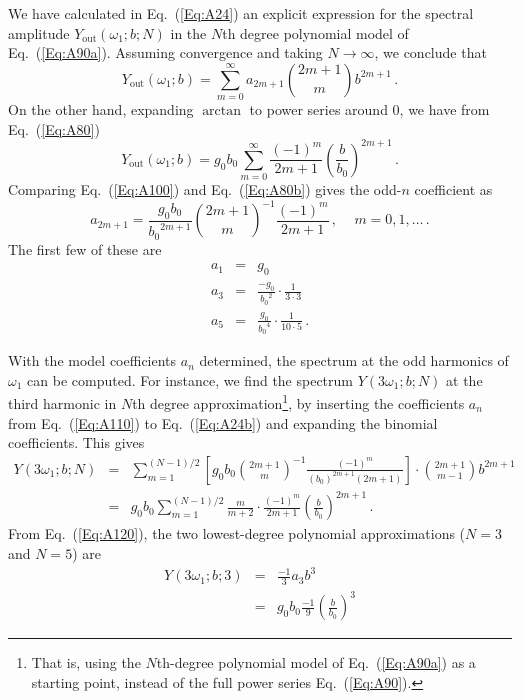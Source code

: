 \documentclass[11pt,oneside,a4paper]{scrartcl}
\newcommand{\EQ}[1]{\begin{equation}\label{Eq:#1}}
\newcommand{\EE}{\end{equation}}
\newcommand{\Eq}[1]{Eq.~(\ref{Eq:#1})}
\newcommand { \mr }[1] {\ensuremath {\mathrm{#1}}}
\begin{document}
We have calculated in \Eq{A24} an explicit expression for the spectral amplitude 
$Y_\mr{out}(\omega_1;b;N)$ in the $N$th degree polynomial model of \Eq{A90a}. Assuming convergence and taking $N \rightarrow \infty$, we conclude that
\EQ{A100}
	Y_\mr{out}(\omega_1;b) = 
				\sum_{m=0}^{\infty} a_{2m+1} \binom{2m+1}{m} b^{2m+1} \,.
\EE
On the other hand, expanding $\arctan$ to power series around $0$, we have from \Eq{A80}
\EQ{A80b}
    Y_\mr{out}(\omega_1;b) =
            g_0 b_0 \sum_{m=0}^{\infty} 
            \frac{(-1)^m}{2m+1} 
            \left( \frac {b}{b_0} \right)^{2m+1} \,.
\EE
Comparing \Eq{A100} and \Eq{A80b} gives the odd-$n$ coefficient as
\EQ{A110}
	a_{2m+1} = \frac{g_0b_0}{{b_0}^{ 2m+1 }}{\binom{2m+1}{m}}^{-1} 
				\frac { (-1)^m} { 2m+1 }\,, \,\,\,
				\mbox{ $m = 0,1,\dots$}
				\,.
\EE
The first few of these are
\begin{eqnarray}
	a_1 &=& g_0 \nonumber \\
	a_3 &=& \frac{-g_0}{{b_0}^2} \cdot \frac{1}{3 \cdot 3}  \\
	a_5 &=& \frac{g_0}{{b_0}^4} \cdot \frac{1}{10 \cdot 5} \nonumber \,.
\end{eqnarray}

With the model coefficients $a_n$ determined, the spectrum at the odd harmonics of $\omega_1$ can be computed. For instance, we find the spectrum $Y(3\omega_1;b;N)$ at the third harmonic in $N$th degree approximation\footnote{That is, using the $N$th-degree polynomial model of \Eq{A90a} as a starting point, instead of the full power series \Eq{A90}.
},
%
by inserting the coefficients $a_n$ from \Eq{A110} to \Eq{A24b} and expanding the binomial coefficients. This gives
\begin{eqnarray}
	Y(3\omega_1;b;N) 
		&=& 
		\sum_{m=1}^{(N-1)/2} 
			\left[
			g_0	b_0
			{\binom {2m+1}{m}}^{-1}
			\frac {(-1)^m} {(b_0)^{2m+1}(2m+1)} 
			\right]
			\cdot
			\binom{2m+1}{m-1} 
			b^{2m+1}
			\nonumber \\
		&=& 
			g_0 b_0
			\sum_{m=1}^{(N-1)/2} 
			\frac{m}{m+2} \cdot \frac{(-1)^m}{2m+1} \left(\frac{b}{b_0}\right)^{2m+1} \,.
			\label{Eq:A120}			
\end{eqnarray}
From \Eq{A120}, the two lowest-degree polynomial approximations ($N=3$ and $N=5$) are
\begin{eqnarray}
	Y(3\omega_1;b;3) 
	&=& 
		\frac{-1}{3}a_3 b^3 \nonumber \\
	&=&  
		g_0b_0 \frac {-1}{9} \left( \frac{b}{b_0} \right)^3
\end{eqnarray}
\end{document}
